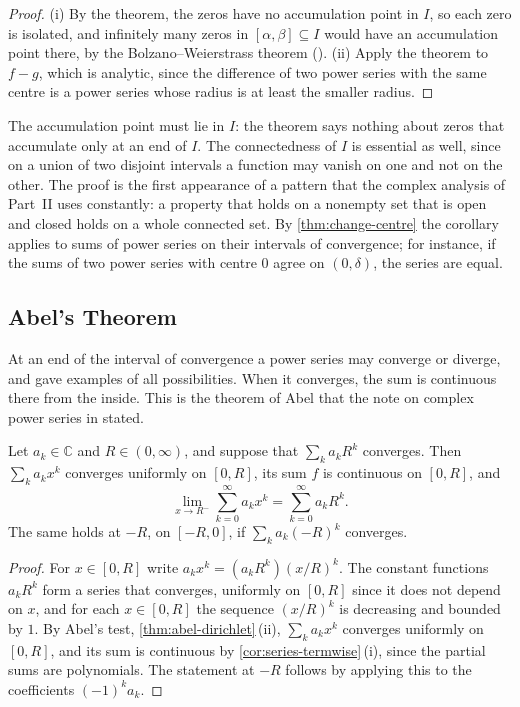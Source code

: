 \begin{proof}
(i) By the theorem, the zeros have no accumulation point in $I$, so each zero is isolated, and infinitely many zeros in $[\alpha,\beta]\subseteq I$ would have an accumulation point there, by the Bolzano--Weierstrass theorem (). (ii) Apply the theorem to $f-g$, which is analytic, since the difference of two power series with the same centre is a power series whose radius is at least the smaller radius.
\end{proof}

The accumulation point must lie in $I$: the theorem says nothing about zeros that accumulate only at an end of $I$. The connectedness of $I$ is essential as well, since on a union of two disjoint intervals a function may vanish on one and not on the other. The proof is the first appearance of a pattern that the complex analysis of Part~II uses constantly: a property that holds on a nonempty set that is open and closed holds on a whole connected set. By \cref{thm:change-centre} the corollary applies to sums of power series on their intervals of convergence; for instance, if the sums of two power series with centre $0$ agree on $(0,\delta)$, the series are equal.

\subsection{Abel's Theorem}

At an end of the interval of convergence a power series may converge or diverge, and  gave examples of all possibilities. When it converges, the sum is continuous there from the inside. This is the theorem of Abel that the note on complex power series in  stated.

\begin{theorem}
\label{thm:abel}
Let $a_k\in\mathbb C$ and $R\in(0,\infty)$, and suppose that $\sum_ka_kR^k$ converges. Then $\sum_ka_kx^k$ converges uniformly on $[0,R]$, its sum $f$ is continuous on $[0,R]$, and
\[
\lim_{x\to R^-}\sum_{k=0}^\infty a_kx^k=\sum_{k=0}^\infty a_kR^k .
\]
The same holds at $-R$, on $[-R,0]$, if $\sum_ka_k(-R)^k$ converges.
\end{theorem}

\begin{proof}
For $x\in[0,R]$ write $a_kx^k=(a_kR^k)(x/R)^k$. The constant functions $a_kR^k$ form a series that converges, uniformly on $[0,R]$ since it does not depend on $x$, and for each $x\in[0,R]$ the sequence $(x/R)^k$ is decreasing and bounded by $1$. By Abel's test, \cref{thm:abel-dirichlet}\,(ii), $\sum_ka_kx^k$ converges uniformly on $[0,R]$, and its sum is continuous by \cref{cor:series-termwise}\,(i), since the partial sums are polynomials. The statement at $-R$ follows by applying this to the coefficients $(-1)^ka_k$.
\end{proof}

